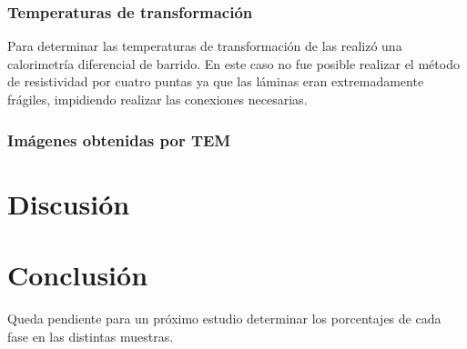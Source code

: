 \documentclass{article}
\theoremstyle{definition}
\theoremstyle{remark}
\begin{document}
\subsubsection{Temperaturas de transformación}
Para determinar las temperaturas de transformación de las realizó una calorimetría diferencial de barrido. En este caso no fue posible realizar el método de resistividad por cuatro puntas ya que las láminas eran extremadamente frágiles, impidiendo realizar las conexiones necesarias.
\subsubsection{Imágenes obtenidas por TEM}



\section{Discusión}
\section{Conclusión}
Queda pendiente para un próximo estudio determinar los porcentajes de cada fase en las distintas muestras.
\newpage

\nocite{*} 


\end{document}
